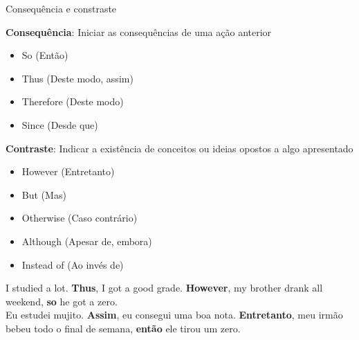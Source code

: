 \documentclass[compress,mathserif,xcolor=table]{beamer}
\begin{document}
\begin{frame}{Consequência e constraste}

\textbf{Consequência}: Iniciar as consequências de uma ação anterior

\vspace{0.25cm}

\begin{minipage}{.49\textwidth}
\begin{itemize}
    \item So (Então)
    \item Thus (Deste modo, assim)
\end{itemize}
\end{minipage}
\begin{minipage}{.49\textwidth}
\begin{itemize}
    \item Therefore (Deste modo)
    \item Since (Desde que)
\end{itemize}
\end{minipage}

\vspace{0.25cm}

\textbf{Contraste}: Indicar a existência de conceitos ou ideias opostos a algo apresentado

\vspace{0.25cm}

\begin{minipage}{.49\textwidth}
\begin{itemize}
    \item However (Entretanto)
    \item But (Mas)
    \item Otherwise (Caso contrário)
\end{itemize}
\end{minipage}
\begin{minipage}{.49\textwidth}
\begin{itemize}
    \item Although (Apesar de, embora)
    \item Instead of (Ao invés de)
\end{itemize}
\end{minipage}

\vspace{0.5cm}

I studied a lot. \textbf{Thus}, I got a good grade. \textbf{However}, my brother drank all weekend, \textbf{so} he got a zero. \\
\vspace{0.15cm}
Eu estudei mujito. \textbf{Assim}, eu consegui uma boa nota. \textbf{Entretanto}, meu irmão bebeu todo o final de semana, \textbf{então} ele tirou um zero.

\end{frame}
\end{document}
